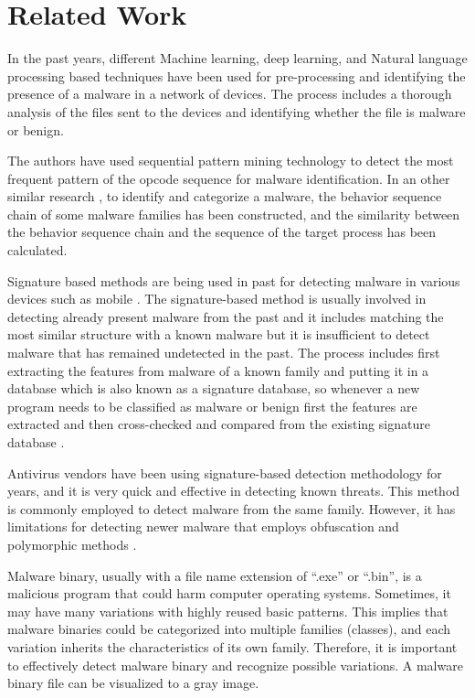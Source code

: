 \documentclass[conference]{IEEEtran}
\begin{document}
\section{Related Work}
In the past years, different Machine learning, deep learning, and Natural language processing based techniques have been used for pre-processing and identifying the presence of a malware in a network of devices. The process includes a thorough analysis of the files sent to the devices and identifying whether the file is malware or benign.

The authors \cite{b19} have used sequential pattern mining technology to detect the most frequent pattern of the opcode sequence for malware identification. In an other similar research \cite{b20}, to identify and categorize a malware, the behavior sequence chain of some malware families has been constructed, and the similarity between the behavior sequence chain and the sequence of the target process has been calculated.

Signature based methods are being used in past for detecting malware in various devices such as mobile \cite{b28}.
The signature-based method is usually involved in detecting already present malware from the past and it includes matching the most similar structure with a known malware but it is insufficient to detect malware that has remained undetected in the past. The process includes first extracting the features from malware of a known family and putting it in a database which is also known as a signature database, so whenever a new program needs to be classified as malware or benign first the features are extracted and then cross-checked and compared from the existing signature database \cite{b21}\cite{b22}. 

Antivirus vendors have been using signature-based detection methodology for years, and it is very quick and effective in detecting known threats. This method is commonly employed to detect malware from the same family. However, it has limitations for detecting newer malware that employs obfuscation and polymorphic methods \cite{b23}.

Malware binary, usually with a file name extension of “.exe” or “.bin”, is a malicious program that could harm computer operating systems. Sometimes, it may have many variations with highly reused basic patterns. This implies that malware binaries could be categorized into multiple families (classes), and each variation inherits the characteristics of its own family. Therefore, it is important to effectively detect malware binary and recognize possible variations. A malware binary file can be visualized to a gray image.
\end{document}
